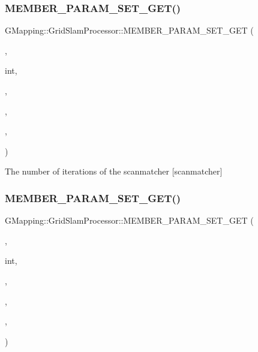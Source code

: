 \subsubsection{\texorpdfstring{M\+E\+M\+B\+E\+R\+\_\+\+P\+A\+R\+A\+M\+\_\+\+S\+E\+T\+\_\+\+G\+E\+T()}{MEMBER\_PARAM\_SET\_GET()}\hspace{0.1cm}{\footnotesize\ttfamily [8/16]}}
{\footnotesize\ttfamily G\+Mapping\+::\+Grid\+Slam\+Processor\+::\+M\+E\+M\+B\+E\+R\+\_\+\+P\+A\+R\+A\+M\+\_\+\+S\+E\+T\+\_\+\+G\+ET (\begin{DoxyParamCaption}\item[{\hyperlink{classGMapping_1_1GridSlamProcessor_ac50952d259590c4aeba22eee4e6437f5}{m\+\_\+matcher}}]{,  }\item[{unsigned}]{int,  }\item[{opt\+Recursive\+Iterations}]{,  }\item[{protected}]{,  }\item[{public}]{,  }\item[{public}]{ }\end{DoxyParamCaption})}

The number of iterations of the scanmatcher \mbox{[}scanmatcher\mbox{]} \mbox{\label{classGMapping_1_1GridSlamProcessor_a600cd2d77f3662e3c4c6c241be4aaaac}} 
\subsubsection{\texorpdfstring{M\+E\+M\+B\+E\+R\+\_\+\+P\+A\+R\+A\+M\+\_\+\+S\+E\+T\+\_\+\+G\+E\+T()}{MEMBER\_PARAM\_SET\_GET()}\hspace{0.1cm}{\footnotesize\ttfamily [9/16]}}
{\footnotesize\ttfamily G\+Mapping\+::\+Grid\+Slam\+Processor\+::\+M\+E\+M\+B\+E\+R\+\_\+\+P\+A\+R\+A\+M\+\_\+\+S\+E\+T\+\_\+\+G\+ET (\begin{DoxyParamCaption}\item[{\hyperlink{classGMapping_1_1GridSlamProcessor_ac50952d259590c4aeba22eee4e6437f5}{m\+\_\+matcher}}]{,  }\item[{unsigned}]{int,  }\item[{likelihood\+Skip}]{,  }\item[{protected}]{,  }\item[{public}]{,  }\item[{public}]{ }\end{DoxyParamCaption})}

